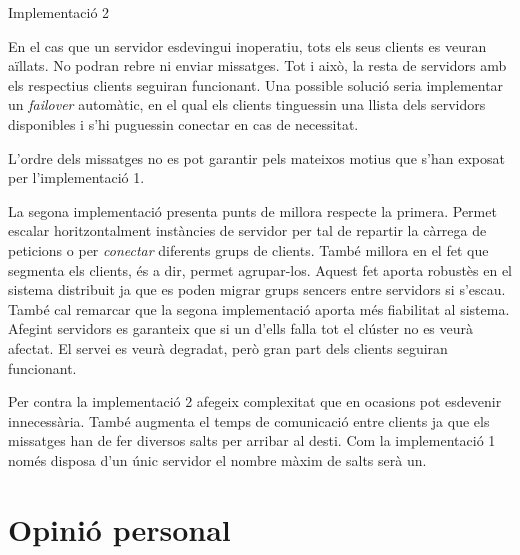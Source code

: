 \documentclass[a4paper, 11pt]{article}
\begin{document}
Implementació 2

En el cas que un servidor esdevingui inoperatiu, tots els seus clients es veuran aïllats. No podran rebre ni enviar missatges. Tot i això, la resta de servidors amb els respectius clients seguiran funcionant.
Una possible solució seria implementar un \textit{failover} autom\`atic, en el qual els clients tinguessin una llista dels servidors disponibles i s'hi puguessin conectar en cas de necessitat.

L'ordre dels missatges no es pot garantir pels mateixos motius que s'han exposat per l'implementació 1.

La segona implementació presenta punts de millora respecte la primera. Permet escalar horitzontalment instàncies de servidor per tal de repartir la càrrega de peticions o per \textit{conectar} diferents grups de clients. També millora en el fet que segmenta els clients, és a dir, permet agrupar-los. Aquest fet aporta robustès en el sistema distribuit ja que es poden migrar grups sencers entre servidors si s'escau. 
També cal remarcar que la segona implementació aporta més fiabilitat al sistema. Afegint servidors es garanteix que si un d'ells falla tot el clúster no es veurà afectat. El servei es veurà degradat, però gran part dels clients seguiran funcionant. 

Per contra la implementació 2 afegeix complexitat que en ocasions pot esdevenir innecessària. També augmenta el temps de comunicació entre clients ja que els missatges han de fer diversos salts per arribar al desti. Com la implementació 1 només disposa d'un únic servidor el nombre màxim de salts serà un. 


\section{Opinió personal}

\end{document}
